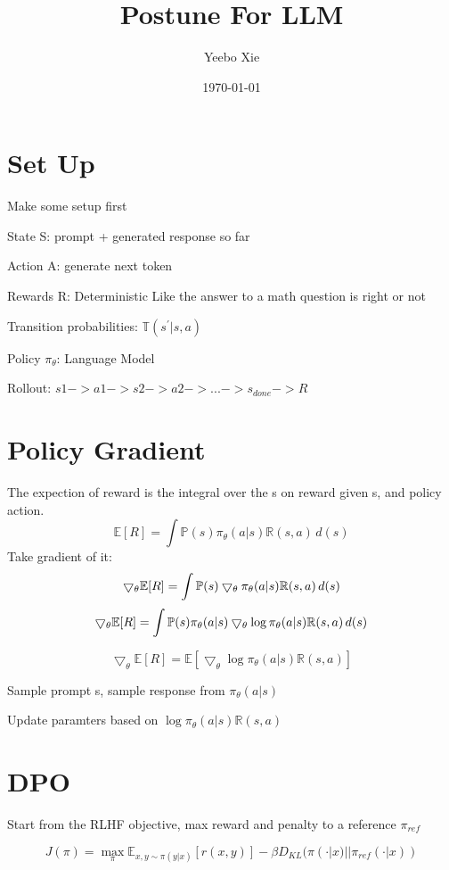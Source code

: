 \documentclass[]{article}
\title{Postune For LLM}
\author{Yeebo Xie}
\date{\today}
\begin{document}
\maketitle
\section{Set Up}

Make some setup first

State S: prompt + generated response so far

Action A: generate next token

Rewards R: Deterministic Like the answer to a math question is right or not

Transition probabilities: $\mathbb{T}(s^{'} | s, a)$

Policy $\pi_{\theta}$: Language Model

Rollout: $s1 -> a1 -> s2 -> a2 -> ... -> s_{done} -> R$



\section{Policy Gradient}
The expection of reward is the integral over the s on reward given s, and policy action.
$$
\mathbb{E}[R] = \int \mathbb{P}(s)\pi_{\theta}(a|s) \mathbb{R}(s,a) \,d(s)
$$ 
Take gradient of it:
$$
\bigtriangledown_{\theta} \mathbb{E}[R] = \int  \mathbb{P}(s)\bigtriangledown_{\theta}\pi_{\theta}(a|s) \mathbb{R}(s,a) \,d(s) \\
$$
$$
\bigtriangledown_{\theta} \mathbb{E}[R] = \int  \mathbb{P}(s) \pi_{\theta}(a|s) \bigtriangledown_{\theta} \log \pi_{\theta}(a|s) \mathbb{R}(s,a) \,d(s) \\
$$

$$
\bigtriangledown_{\theta} \mathbb{E}[R] = \mathbb{E} [ \bigtriangledown_{\theta} \log \pi_{\theta}(a|s) \mathbb{R}(s,a) ]
$$

Sample prompt s, sample response from $\pi_{\theta}(a|s)$

Update paramters based on $\log \pi_{\theta}(a|s) \mathbb{R}(s,a)$

\section{DPO}

Start from the RLHF objective, max reward and penalty to a reference $\pi_{ref}$

$$
J(\pi) = \max_{\pi} \mathbb{E}_{x,y\sim\pi(y|x)}[r(x,y)] - \beta D_{KL}(\pi(\cdot|x) || \pi_{ref}(\cdot|x))
$$
\end{document}
